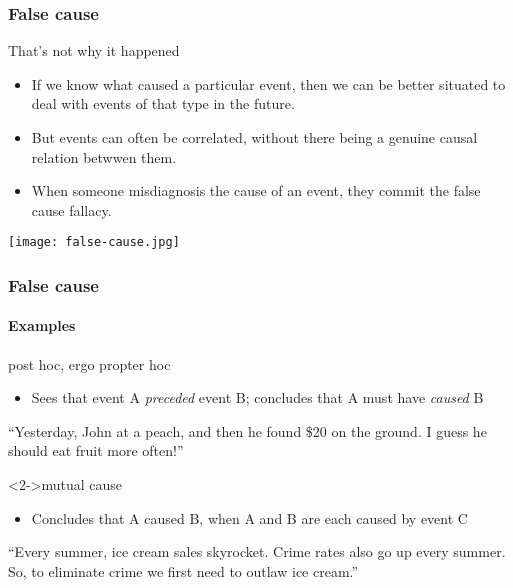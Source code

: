 \documentclass[10pt,letterpaper,xcolor=dvipsnames]{beamer}
\begin{document}
\begin{frame}
  \frametitle{False cause}
  
  \begin{block}{That's not why it happened}
    \begin{itemize}
      \item If we know what caused a particular event, then we can be better situated to deal with events of that type in the future.
      \item But events can often be correlated, without there being a genuine causal relation betwwen them.
      \item When someone misdiagnosis the cause of an event, they commit the false cause fallacy.
    \end{itemize}
  \end{block}
  
    \begin{center}
    \texttt{[image: false-cause.jpg]}
  \end{center}
  
\end{frame}

\begin{frame}
  \frametitle{False cause}
  \framesubtitle{Examples}
  
  \begin{block}{post hoc, ergo propter hoc}
    \begin{itemize}
      \item Sees that event A \textit{preceded} event B; concludes that A must have \textit{caused} B
    \end{itemize}
    
    ``Yesterday, John at a peach, and then he found \$20 on the ground.  I guess he should eat fruit more often!''
  \end{block}
  
  \begin{block}<2->{mutual cause}
    \begin{itemize}
      \item Concludes that A caused B, when A and B are each caused by event C
    \end{itemize}
    
    ``Every summer, ice cream sales skyrocket.  Crime rates also go up every summer.  So, to eliminate crime we first need to outlaw ice cream.''
  \end{block}
  
\end{frame}
\end{document}
